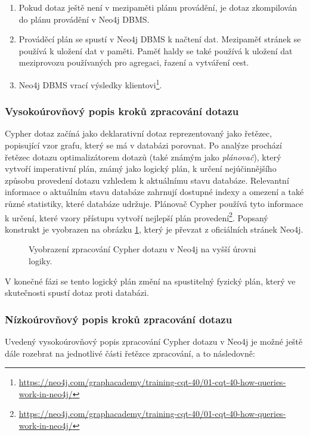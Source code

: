 \documentclass[a4paper, 11pt]{article}
\makeatletter
\newcommand\footnoteref[1]{\protected@xdef\@thefnmark{\ref{#1}}\@footnotemark}
\makeatother
\begin{document}
    \begin{enumerate}
        \item Pokud dotaz ještě není v mezipaměti plánu provádění, je dotaz zkompilován do plánu provádění v Neo4j DBMS.
        \item Prováděcí plán se spustí v Neo4j DBMS k načtení dat. Mezipaměť stránek se používá k uložení dat v paměti. Paměť haldy se také používá k uložení dat meziprovozu používaných pro agregaci, řazení a vytváření cest.
        \item Neo4j DBMS vrací výsledky klientovi\footnote{\url{https://neo4j.com/graphacademy/training-cqt-40/01-cqt-40-how-queries-work-in-neo4j/}}.
    \end{enumerate}

    \subsubsection{Vysokoúrovňový popis kroků zpracování dotazu}
    Cypher dotaz začíná jako deklarativní dotaz reprezentovaný jako řetězec, popisující vzor grafu, který se má v databázi porovnat. Po analýze prochází řetězec dotazu optimalizátorem dotazů (také známým jako \textit{plánovač}), který vytvoří imperativní plán, známý jako logický plán, k určení nejúčinnějšího způsobu provedení dotazu vzhledem k aktuálnímu stavu databáze. Relevantní informace o aktuálním stavu databáze zahrnují dostupné indexy a omezení a také různé statistiky, které databáze udržuje. Plánovač Cypher používá tyto informace k určení, které vzory přístupu vytvoří nejlepší plán provedení\footnote{\label{note1}\url{https://neo4j.com/graphacademy/training-cqt-40/01-cqt-40-how-queries-work-in-neo4j/}}. Popsaný konstrukt je vyobrazen na obrázku \ref{high_level_neo4j}, který je převzat z oficiálních stránek Neo4j\footnoteref{note1}.

    \begin{figure}[ht!]
        \centering        
        
        \caption{Vyobrazení zpracování Cypher dotazu v Neo4j na vyšší úrovni logiky\label{high_level_neo4j}.}
    \end{figure}
    
    V konečné fázi se tento logický plán změní na spustitelný fyzický plán, který ve skutečnosti spustí dotaz proti databázi\footnoteref{note1}.
    
    \subsubsection{Nízkoúrovňový popis kroků zpracování dotazu}
    Uvedený vysokoúrovňový popis zpracování Cypher dotazu v Neo4j je možné ještě dále rozebrat na jednotlivé části řetězce zpracování, a to následovně:
\end{document}
